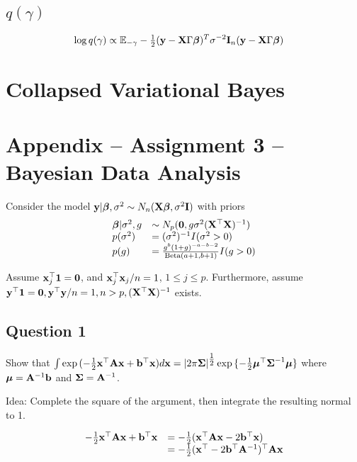 \documentclass{amsart}[12pt]
\theoremstyle{definition}
\begin{document}
\subsection{$q(\gamma)$}
\begin{align*}
	\log q(\gamma) & \propto \mathbb{E}_{-\gamma} -\tfrac{1}{2} ({\bf y} - {\bf X} \Gamma {\boldsymbol\beta})^T \sigma^{-2} {\bf I}_n ({\bf y} - {\bf X} \Gamma {\boldsymbol\beta}) 
\end{align*}

\section{Collapsed Variational Bayes}

\section{Appendix -- Assignment 3 -- Bayesian Data Analysis}

Consider the model ${\bf y} | {\boldsymbol \beta}, \sigma^2 \sim N_n({\bf X} {\boldsymbol \beta}, \sigma^2 {\bf I})$ with priors
\begin{equation*}
	\begin{array}{ll}
		{\boldsymbol\beta} | \sigma^2, g & \sim N_p({\bf 0}, g \sigma^2({\bf X}^\top {\bf X})^{-1})                       \\
		p(\sigma^2)          & = (\sigma^2)^{-1} I(\sigma^2 > 0)                                     \\
		p(g)                 & = \frac{g^b (1 + g)^{-a - b - 2}}{\text{Beta}(a + 1, b + 1)} I(g > 0) 
	\end{array}
\end{equation*}

Assume ${\bf x}_j^\top{\bf1} = {\bf 0}$, and ${\bf x}_j^\top {\bf x}_j / n = 1$, $1 \leq j \leq p$.
Furthermore, assume ${\bf y}^\top {\bf1} = {\bf 0}, {\bf y}^\top {\bf y} / n  = 1, n > p, ({\bf X}^\top {\bf X})^{-1}$ exists.

\subsection{Question 1}

Show that $\int \exp{(- \tfrac{1}{2} {\bf x}^\top {\bf A}{\bf x}+ {\bf b}^\top {\bf x})} d {\bf x} = |2 \pi {\boldsymbol\Sigma}|^{\tfrac{1}{2}} \exp{\{ - \tfrac{1}{2} {\boldsymbol\mu}^\top {\boldsymbol\Sigma}^{-1} {\boldsymbol\mu}\}}$ where ${\boldsymbol \mu} = {\bf A}^{-1} {\bf b}$ and ${\boldsymbol \Sigma} = {\bf A}^{-1}$.

Idea: Complete the square of the argument, then integrate the resulting normal to 1.

\begin{equation*}
	\begin{array}{ll}
		-\tfrac{1}{2} {\bf x}^\top {\bf A} {\bf x} + {\bf b}^\top {\bf x} & = -\tfrac{1}{2} ({\bf x}^\top {\bf A} {\bf x} - 2 {\bf b}^\top {\bf x})           \\
		                                       & = -\tfrac{1}{2} ({\bf x}^\top - 2 {\bf b}^\top {\bf A}^{-1})^\top {\bf A} {\bf x} 
	\end{array}
\end{equation*}
\end{document}
